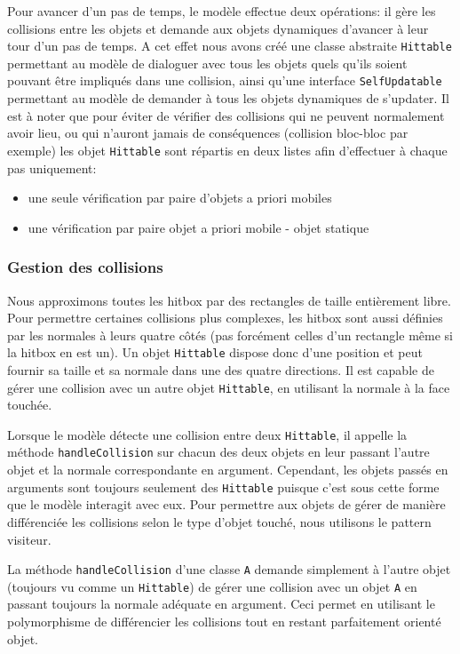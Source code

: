 \documentclass[a4paper, 12pt]{article}
\begin{document}
Pour avancer d'un pas de temps, le modèle effectue deux opérations: il gère les collisions entre les objets et demande aux objets dynamiques d'avancer à leur tour d'un pas de temps. A cet effet nous avons créé une classe abstraite {\tt Hittable} permettant au modèle de dialoguer avec tous les objets quels qu'ils soient pouvant être impliqués dans une collision, ainsi qu'une interface {\tt SelfUpdatable} permettant au modèle de demander à tous les objets dynamiques de s'updater. Il est à noter que pour éviter de vérifier des collisions qui ne peuvent normalement avoir lieu, ou qui n'auront jamais de conséquences (collision bloc-bloc par exemple) les objet {\tt Hittable} sont répartis en deux listes afin d'effectuer à chaque pas uniquement:
\begin{itemize}
  \item une seule vérification par paire d'objets a priori mobiles
  \item une vérification par paire objet a priori mobile - objet statique
\end{itemize}

\subsubsection{Gestion des collisions}

Nous approximons toutes les hitbox par des rectangles de taille entièrement libre. Pour permettre certaines collisions plus complexes, les hitbox sont aussi définies par les normales à leurs quatre côtés (pas forcément celles d'un rectangle même si la hitbox en est un). Un objet {\tt Hittable} dispose donc d'une position et peut fournir sa taille et sa normale dans une des quatre directions. Il est capable de gérer une collision avec un autre objet {\tt Hittable}, en utilisant la normale à la face touchée.

Lorsque le modèle détecte une collision entre deux {\tt Hittable}, il appelle la méthode {\tt handleCollision} sur chacun des deux objets en leur passant l'autre objet et la normale correspondante en argument. Cependant, les objets passés en arguments sont toujours seulement des {\tt Hittable} puisque c'est sous cette forme que le modèle interagit avec eux. Pour permettre aux objets de gérer de manière différenciée les collisions selon le type d'objet touché, nous utilisons le pattern visiteur.

La méthode {\tt handleCollision} d'une classe {\tt A} demande simplement à l'autre objet (toujours vu comme un {\tt Hittable}) de gérer une collision avec un objet {\tt A} en passant toujours la normale adéquate en argument. Ceci permet en utilisant le polymorphisme de différencier les collisions tout en restant parfaitement orienté objet.
\end{document}
